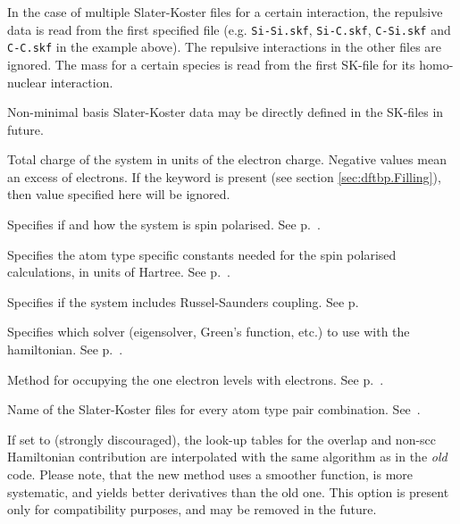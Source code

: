 \begin{description}
  In the case of multiple Slater-Koster files for a certain
  interaction, the repulsive data is read from the first specified
  file (e.g. \verb|Si-Si.skf|, \verb|Si-C.skf|, \verb|C-Si.skf| and
  \verb|C-C.skf| in the example above). The repulsive interactions in
  the other files are ignored. The mass for a certain species is read
  from the first SK-file for its homo-nuclear interaction.

  Non-minimal basis Slater-Koster data may be directly defined in the
  SK-files in future.

\item[\is{Charge}] Total charge of the system in units of the electron
  charge. Negative values mean an excess of electrons. If the keyword
   is present (see section \ref{sec:dftbp.Filling}), then value
  specified here will be ignored.

\item[\is{SpinPolarisation}] Specifies if and how the system is spin
  polarised. See p.~.

\item[\is{SpinConstants}] Specifies the atom type specific constants needed for
  the spin polarised calculations, in units of Hartree.  See
  p.~.

\item[\is{SpinOrbit}] Specifies if the system includes Russel-Saunders
  coupling. See p.~

\item[\is{Solver}] Specifies which solver (eigensolver, Green's function, etc.)
  to use with the hamiltonian. See p.~.

\item[\is{Filling}] Method for occupying the one electron levels with
  electrons. See p.~.

\item[\is{SlaterKosterFiles}] Name of the Slater-Koster files for every atom
  type pair combination. See~.

\item[\is{OldSKInterpolation}] If set to  (strongly
  discouraged), the look-up tables for the overlap and non-scc
  Hamiltonian contribution are interpolated with the same algorithm as
  in the \emph{old} {\dftb} code. Please note, that the new method
  uses a smoother function, is more systematic, and yields better
  derivatives than the old one.  This option is present only for
  compatibility purposes, and may be removed in the future.


\end{description}
